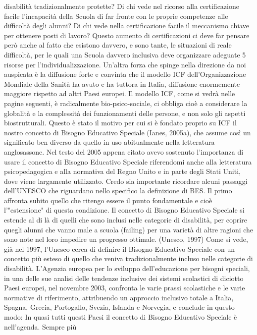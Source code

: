 disabilità tradizionalmente protette? Di chi vede nel ricorso alla certificazione facile l’incapacità
della Scuola di far fronte con le proprie competenze alle difficoltà degli alunni? Di chi vede nella
certificazione facile il meccanismo chiave per ottenere posti di lavoro? Questo aumento di
certificazioni ci deve far pensare però anche al fatto che esistono davvero, e sono tante, le
situazioni di reale difficoltà, per le quali una Scuola davvero inclusiva deve organizzare adeguate
5
risorse per l’individualizzazione.
Un’altra forza che spinge nella direzione da noi auspicata è la diffusione forte e convinta che il
modello ICF dell’Organizzazione Mondiale della Sanità ha avuto e ha tuttora in Italia, diffusione
enormemente maggiore rispetto ad altri Paesi europei. Il modello ICF, come si vedrà nelle pagine
seguenti, è radicalmente bio-psico-sociale, ci obbliga cioè a considerare la globalità e la
complessità dei funzionamenti delle persone, e non solo gli aspetti biostrutturali. Questo è stato il
motivo per cui si è fondato proprio su ICF il nostro concetto di Bisogno Educativo Speciale (Ianes,
2005a), che assume così un significato ben diverso da quello in uso abitualmente nella letteratura
anglosassone.
Nel testo del 2005 appena citato avevo sostenuto l’importanza di usare il concetto di Bisogno
Educativo Speciale riferendomi anche alla letteratura psicopedagogica e alla normativa del Regno
Unito e in parte degli Stati Uniti, dove viene largamente utilizzato.
Credo sia importante ricordare alcuni passaggi dell'UNESCO che riguardano nello specifico la
definizione di BES. Il primo affronta subito quello che ritengo essere il punto fondamentale e cioè
l'"estensione" di questa condizione.
Il concetto di Bisogno Educativo Speciale si estende al di là di quelli che sono inclusi nelle
categorie di disabilità, per coprire quegli alunni che vanno male a scuola (failing) per una varietà di
altre ragioni che sono note nel loro impedire un progresso ottimale. (Unesco, 1997)
Come si vede, già nel 1997, l'Unesco cerca di definire il Bisogno Educativo Speciale con un
concetto più esteso di quello che veniva tradizionalmente incluso nelle categorie di disabilità.
L'Agenzia europea per lo sviluppo dell'educazione per bisogni speciali, in una delle sue analisi
delle tendenze inclusive dei sistemi scolastici di diciotto Paesi europei, nel novembre 2003,
confronta le varie prassi scolastiche e le varie normative di riferimento, attribuendo un approccio
inclusivo totale a Italia, Spagna, Grecia, Portogallo, Svezia, Islanda e Norvegia, e conclude in questo
modo:
In quasi tutti questi Paesi il concetto di Bisogno Educativo Speciale è nell'agenda. Sempre più
